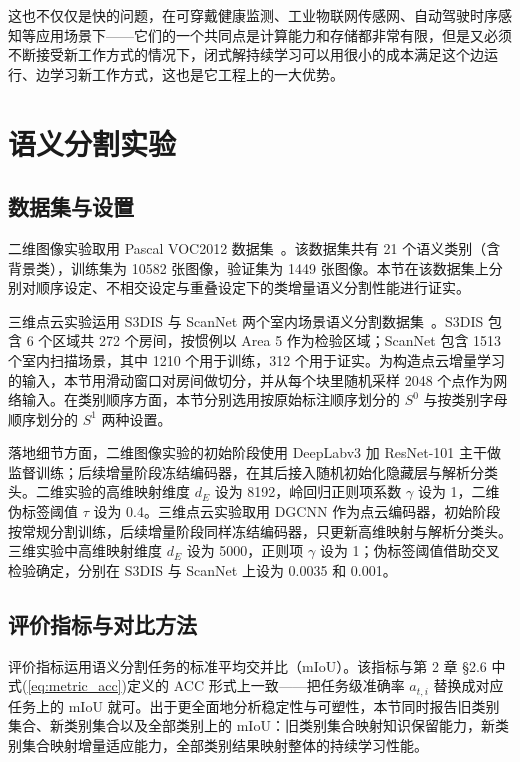 这也不仅仅是快的问题，在可穿戴健康监测、工业物联网传感网、自动驾驶时序感知等应用场景下——它们的一个共同点是计算能力和存储都非常有限，但是又必须不断接受新工作方式的情况下，闭式解持续学习可以用很小的成本满足这个边运行、边学习新工作方式，这也是它工程上的一大优势。

\section{语义分割实验}

\subsection{数据集与设置}

二维图像实验取用 Pascal VOC2012 数据集~\citep{everingham2010voc}。该数据集共有 21 个语义类别（含背景类），训练集为 10582 张图像，验证集为 1449 张图像。本节在该数据集上分别对顺序设定、不相交设定与重叠设定下的类增量语义分割性能进行证实。

三维点云实验运用 S3DIS 与 ScanNet 两个室内场景语义分割数据集~\citep{armeni2016s3dis,dai2017scannet}。S3DIS 包含 6 个区域共 272 个房间，按惯例以 Area 5 作为检验区域；ScanNet 包含 1513 个室内扫描场景，其中 1210 个用于训练，312 个用于证实。为构造点云增量学习的输入，本节用滑动窗口对房间做切分，并从每个块里随机采样 2048 个点作为网络输入。在类别顺序方面，本节分别选用按原始标注顺序划分的 $S^0$ 与按类别字母顺序划分的 $S^1$ 两种设置。

落地细节方面，二维图像实验的初始阶段使用 DeepLabv3 加 ResNet-101 主干做监督训练；后续增量阶段冻结编码器，在其后接入随机初始化隐藏层与解析分类头。二维实验的高维映射维度 $d_E$ 设为 8192，岭回归正则项系数 $\gamma$ 设为 1，二维伪标签阈值 $\tau$ 设为 0.4。三维点云实验取用 DGCNN 作为点云编码器，初始阶段按常规分割训练，后续增量阶段同样冻结编码器，只更新高维映射与解析分类头。三维实验中高维映射维度 $d_E$ 设为 5000，正则项 $\gamma$ 设为 1；伪标签阈值借助交叉检验确定，分别在 S3DIS 与 ScanNet 上设为 0.0035 和 0.001。

\subsection{评价指标与对比方法}

评价指标运用语义分割任务的标准平均交并比（mIoU）。该指标与第 2 章 §2.6 中式(\ref{eq:metric_acc})定义的 ACC 形式上一致——把任务级准确率 $a_{t,i}$ 替换成对应任务上的 mIoU 就可。出于更全面地分析稳定性与可塑性，本节同时报告旧类别集合、新类别集合以及全部类别上的 mIoU：旧类别集合映射知识保留能力，新类别集合映射增量适应能力，全部类别结果映射整体的持续学习性能。

